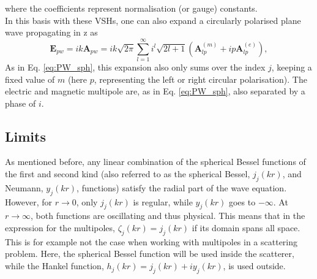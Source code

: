 where the coefficients represent normalisation (or gauge) constants.\\
In this basis with these VSHs, one can also expand a circularly polarised plane wave propagating in z as
\begin{equation}\label{eq:rosePW}
    \mathbf{E}_{pw}=ik\mathbf{A}_{pw}=ik\sqrt{2\pi}\sum_{l=1}^{\infty}i^l\sqrt{2l+1}
    ( \mathbf{A}_{lp}^{(m)}+ip\mathbf{A}_{lp}^{(e)}),
\end{equation}
As in Eq. \ref{eq:PW_sph}, this expansion also only sums over the index $j$, keeping a fixed value of $m$ (here $p$, representing the left or right circular polarisation).  The electric and magnetic multipole are, as in Eq. \ref{eq:PW_sph}, also separated by a phase of $i$.

\subsection{Limits}
As mentioned before, any linear combination of the spherical Bessel functions of the first and second kind (also referred to as the spherical Bessel, $j_j(kr)$, and Neumann, $y_j(kr)$, functions) satisfy the radial part of the wave equation. However, for $r\to0$, only $j_j(kr)$ is regular, while $y_j(kr)$ goes to $-\infty$. At $r\to\infty$, both functions are oscillating and thus physical. This means that in the expression for the multipoles, $\zeta_j(kr)=j_j(kr)$ if its domain spans all space. This is for example not the case when working with multipoles in a scattering problem. Here, the spherical Bessel function will be used inside the scatterer, while the Hankel function, $h_j(kr)=j_j(kr)+iy_j(kr)$, is used outside.













